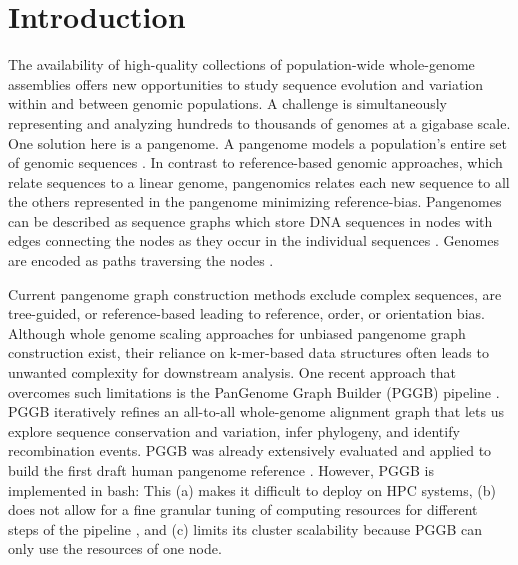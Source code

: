 \documentclass{bioinfo}
\theoremstyle{definition}
\begin{document}
	\maketitle

	\section{Introduction}
	The availability of high-quality collections of population-wide whole-genome assemblies \citep{Liao2023, Kang2023, Weller2023, Zhou2022, Liu2020, Leonard2022} offers new opportunities to study sequence evolution and variation within and between genomic populations. 
	A challenge is simultaneously representing and analyzing hundreds to thousands of genomes at a gigabase scale. One solution here is a pangenome. 
	A pangenome models a population's entire set of genomic sequences \citep{Ballouz2019}. 
	In contrast to reference-based genomic approaches, which relate sequences to a linear genome, pangenomics relates each new sequence to all the others represented in the pangenome \citep{CompPan2016, Eizenga_2020, Sherman_2020} minimizing reference-bias. 
	Pangenomes can be described as sequence graphs which store DNA sequences in nodes with edges connecting the nodes as they occur in the individual sequences \citep{Hein1989}. 
	Genomes are encoded as paths traversing the nodes \citep{Garrison:2018}.
	
	Current pangenome graph construction methods exclude complex sequences, are tree-guided, or reference-based \citep{Li:2020, Hickey2023} leading to reference, order, or orientation bias. 
	Although whole genome scaling approaches for unbiased pangenome graph construction \citep{Chin2023, Minkin2016} exist, their reliance on k-mer-based data structures often leads to unwanted complexity for downstream analysis. 
	One recent approach that overcomes such limitations is the PanGenome Graph Builder (PGGB) pipeline \citep{Garrison2023}. 
	PGGB iteratively refines an all-to-all whole-genome alignment graph that lets us explore sequence conservation and variation, infer phylogeny, and identify recombination events. 
	PGGB was already extensively evaluated \citep{Garrison2023, Andreace2023} and applied to build the first draft human pangenome reference \citep{Liao2023}.
	However, PGGB is implemented in bash: This (a) makes it difficult to deploy on HPC systems, (b) does not allow for a fine granular tuning of computing resources for different steps of the pipeline \citep{Sztuka2024}, and (c) limits its cluster scalability because PGGB can only use the resources of one node.
	
\end{document}
